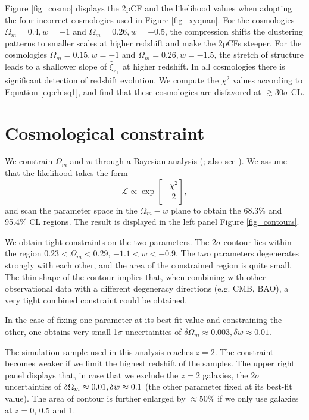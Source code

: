 \documentclass[iop]{emulateapj}
\begin{document}
Figure \ref{fig_cosmo} displays the 2pCF and the likelihood values when adopting 
the four incorrect cosmologies used in Figure \ref{fig_xyquan}.
For the cosmologies $\Omega_m=0.4,w=-1$ and $\Omega_m=0.26,w=-0.5$,
the compression shifts the clustering patterns to smaller scales
at higher redshift and make the 2pCFs steeper.
For the cosmologies $\Omega_m=0.15,w=-1$ and $\Omega_m=0.26,w=-1.5$,
the stretch of structure leads to a shallower slope of $\hat{\xi}_{r_\perp}$ at higher redshift.
In all cosmologies there is significant detection of redshift evolution.
We compute the $\chi^2$ values according to Equation \ref{eq:chisq1}, 
and find that these cosmologies are disfavored 
at $\gtrsim30\sigma$ CL.






\section{Cosmological constraint}


We constrain $\Omega_m$ and $w$ through a Bayesian analysis (\cite{Bayesian}; also see \cite{LB2002,Li2016}).
We assume that the likelihood takes the form
\begin{equation}\label{eq:like}
 \mathcal{L} \propto \exp\left[-\frac{\chi^2}{2}\right],
\end{equation}
and scan the parameter space in the $\Omega_m-w$ plane to obtain the 68.3\% and 95.4\% CL regions.
The result is displayed in the left panel Figure \ref{fig_contours}.


We obtain tight constraints on the two parameters.
The 2$\sigma$ contour lies within the region $0.23<\Omega_m<0.29$, $-1.1<w<-0.9$.
The two parameters degenerates strongly with each other,
and the area of the constrained region is quite small.
The thin shape of the contour implies that, 
when combining with other observational data with a different degeneracy directions (e.g. CMB, BAO),
a very tight combined constraint could be obtained.

In the case of fixing one parameter at its best-fit value and constraining the other,
one obtains very small 1$\sigma$ uncertainties of $\delta\Omega_m\approx0.003,\delta w\approx0.01$.

The simulation sample used in this analysis reaches $z=2$.
The constraint becomes weaker if we limit the highest redshift of the samples.
The upper right panel displays that, 
in case that we exclude the $z=2$ galaxies, 
the 2$\sigma$ uncertainties of $\delta\Omega_m\approx0.01,\\ \delta w\approx0.1$ (the other parameter fixed at its best-fit value).
The area of contour is further enlarged by $\approx 50\%$ if we only use galaxies at $z=$0, 0.5 and 1.
\end{document}
